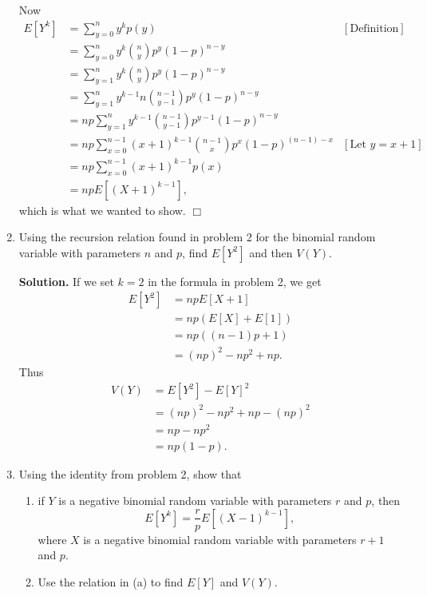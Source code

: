 \documentclass[9pt]{article}
\newcommand{\qed}{\hfill \ensuremath{\Box}}
\begin{document}
\begin{enumerate}
      Now
      \begin{align*}
         E[Y^k] &= \sum_{y=0}^ny^kp(y) &[\text{Definition}] \\
                &= \sum_{y=0}^ny^k\binom{n}{y}p^y(1 - p)^{n - y} \\
                &= \sum_{y=1}^ny^k\binom{n}{y}p^y(1 - p)^{n - y} \\
                &= \sum_{y=1}^ny^{k-1}n\binom{n - 1}{y - 1}p^y(1 - p)^{n - y} \\
                &= np\sum_{y=1}^ny^{k-1}\binom{n - 1}{y - 1}
                   p^{y-1}(1 - p)^{n - y} \\
                &= np\sum_{x=0}^{n-1}(x + 1)^{k-1}\binom{n - 1}{x}
                   p^{x}(1 - p)^{(n - 1)-x} &[\text{Let }y = x + 1] \\
                &= np\sum_{x=0}^{n-1}(x + 1)^{k-1}p(x) \\
                &= npE[(X + 1)^{k-1}],
      \end{align*}
      which is what we wanted to show. \qed
   \item Using the recursion relation found in problem 2 for the binomial random
         variable with parameters $n$ and $p$, find $E[Y^2]$ and then $V(Y)$.

      \textbf{Solution.} If we set $k = 2$ in the formula in problem 2, we get
      \begin{align*}
         E[Y^2] &= npE[X + 1] \\
                &= np(E[X] + E[1]) \\
                &= np((n-1)p + 1) \\
                &= (np)^2 - np^2 + np.
      \end{align*}
      Thus
      \begin{align*}
         V(Y) &= E[Y^2] - E[Y]^2 \\
              &= (np)^2 - np^2 + np - (np)^2 \\
              &= np - np^2 \\
              &= np(1 - p).
      \end{align*}
   \item Using the identity from problem 2, show that
         \begin{enumerate}
            \item if $Y$ is a negative binomial random variable with parameters
                  $r$ and $p$, then
                  $$E[Y^k] = \frac{r}{p}E[(X-1)^{k-1}],$$
                  where $X$ is a negative binomial random variable with 
                  parameters $r + 1$ and $p$.
            \item Use the relation in (a) to find $E[Y]$ and $V(Y)$.
         \end{enumerate}


\end{enumerate}
\end{document}
